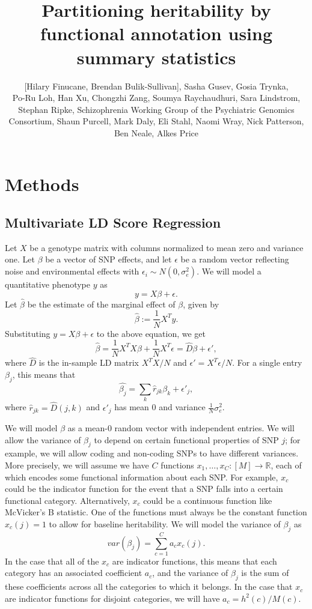 \documentclass[11pt]{article}
\title{Partitioning heritability by functional annotation using summary statistics}
\author{ [Hilary Finucane,  Brendan Bulik-Sullivan],  Sasha Gusev,  Gosia Trynka,\\  
Po-Ru Loh,  Han Xu,  Chongzhi Zang,  Soumya Raychaudhuri,  Sara Lindstrom,\\
Stephan Ripke,  Schizophrenia Working Group of the Psychiatric Genomics\\
Consortium, Shaun Purcell,  Mark Daly,  Eli Stahl,  Naomi Wray,  Nick Patterson,\\
Ben Neale, Alkes Price}
\date{}
\begin{document}
\maketitle

\section{Methods}
\subsection{Multivariate LD Score Regression}
Let $X$ be a genotype matrix with columns normalized to mean zero and variance one. Let $\beta$ be a vector of SNP effects, and let $\epsilon$ be a random vector reflecting noise and environmental effects with $\epsilon_i \sim N(0,\sigma^2_e)$. We will model a quantitative phenotype $y$ as 
$$y = X\beta + \epsilon.$$
Let $\hat{\beta}$ be the estimate of the marginal effect of $\beta$, given by
$$\hat{\beta} := \frac{1}{N} X^T y.$$
Substituting $y = X\beta+\epsilon$ to the above equation, we get
$$\hat{\beta} = \frac{1}{N} X^T X \beta + \frac{1}{N} X^T \epsilon = \hat{D}\beta + \epsilon',$$
where $\hat{D}$ is the in-sample LD matrix $X^TX/N$ and $\epsilon' = X^T\epsilon/N$.
For a single entry $\beta_j$, this means that
$$\hat{\beta_j} = \sum_k \hat{r}_{jk} \beta_k + \epsilon'_j,$$
where $\hat{r}_{jk} = \hat{D}(j,k)$ and $\epsilon'_j$ has mean 0 and variance $ \frac{1}{N}\sigma^2_e$.

We will model $\beta$ as a mean-0 random vector with independent entries. We will allow the variance of $\beta_j$ to depend on certain functional properties of SNP $j$; for example, we will allow coding and non-coding SNPs to have different variances. More precisely, we will assume we have $C$ functions $x_1, \ldots , x_C: [M] \rightarrow \mathbb{R}$, each of which encodes some functional information about each SNP. For example, $x_c$ could be the indicator function for the event that a SNP falls into a certain functional category. Alternatively, $x_c$ could be a continuous function like McVicker's B statistic. One of the functions must always be the constant function $x_c(j) = 1$ to allow for baseline heritability. We will model the variance of $\beta_j$ as
\begin{equation}
\label{varbeta}
var(\beta_j) = \sum_{c=1}^C a_c x_c(j).
\end{equation}
In the case that all of the $x_c$ are indicator functions, this means that each category has an associated coefficient $a_c$, and the variance of $\beta_j$ is the sum of these coefficients across all the categories to which it belongs. In the case that $x_c$ are indicator functions for disjoint categories, we will have $a_c = h^2(c)/M(c)$.
\end{document}
